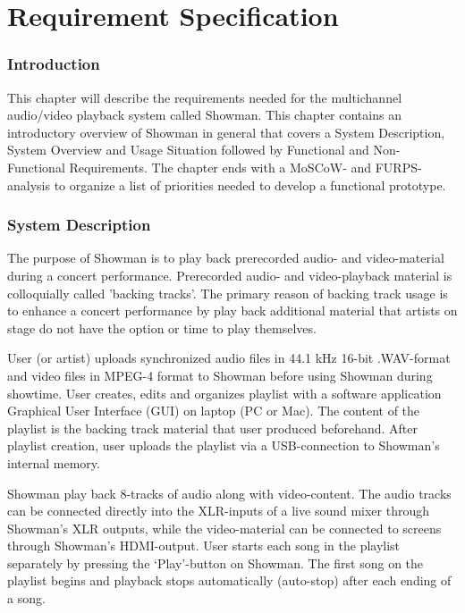 \chapter{Requirement Specification}
\subsection{Introduction}
This chapter will describe the requirements needed for the multichannel audio/video playback system called Showman. This chapter contains an introductory overview of Showman in general that covers a System Description, System Overview and Usage Situation followed by Functional and Non-Functional Requirements. The chapter ends with a MoSCoW- and FURPS-analysis to organize a list of priorities needed to develop a functional prototype. \newline

\subsection{System Description}

The purpose of Showman is to play back prerecorded audio- and video-material during a concert performance. Prerecorded audio- and video-playback material  is colloquially called 'backing tracks'. The primary reason of backing track usage is to enhance a concert performance by play back additional material that artists on stage do not have the option or time to play themselves. \newline

User (or artist) uploads synchronized audio files in 44.1 kHz 16-bit .WAV-format and video files in MPEG-4 format to Showman before using Showman during showtime. User creates, edits and organizes playlist with a software application Graphical User Interface (GUI) on laptop (PC or Mac). The content of the playlist is the backing track material that user produced beforehand. After playlist creation, user uploads the playlist via a USB-connection to Showman's internal memory. \newline

Showman play back 8-tracks of audio along with video-content. The audio tracks can be connected directly into the XLR-inputs of a live sound mixer through Showman's XLR outputs, while the video-material can be connected to screens through Showman's HDMI-output.
User starts each song in the playlist separately by pressing the `Play'-button on Showman. The first song on the playlist begins and playback stops automatically (auto-stop) after each ending of a song. \newline

